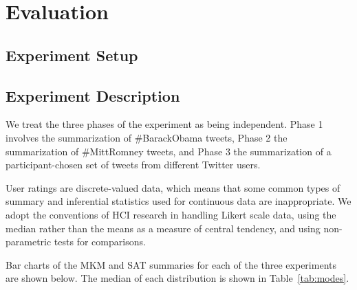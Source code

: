 \chapter{Evaluation}
\label{chap-five}
\newcommand{\ctheaders}[8]%
{\begin{tabular}{r|ccc||ccc|}
 \multicolumn{1}{r}{} & \multicolumn{3}{c}{#1}
      & \multicolumn{3}{c}{#2} \\ \cline{2-7}
 #3 %
      & \hspace{\cta} & #5 & \hspace{\cta}
      & \hspace{\cta} & #7 & \hspace{\cta}\ctstrut \\ \cline{2-7}
 #4 %
      & \hspace{\cta} & #6 & \hspace{\cta}
      & \hspace{\cta} & #8 & \hspace{\cta}\ctstrut \\ \cline{2-7}
\end{tabular}}

\section{Experiment Setup}

\section{Experiment Description}
We treat the three phases of the experiment as being independent.
Phase 1 involves the summarization of \#BarackObama tweets, Phase 2
the summarization of \#MittRomney tweets, and Phase 3 the
summarization of a participant-chosen set of tweets from different
Twitter users.

User ratings are discrete-valued data, which means that some common
types of summary and inferential statistics used for continuous data
are inappropriate.  We adopt the conventions of HCI research in
handling Likert scale data, using the median rather than the means as
a measure of central tendency, and using non-parametric tests for
comparisons.

Bar charts of the MKM and SAT summaries for each of the three
experiments are shown below.  The median of each distribution is shown
in Table~\ref{tab:modes}.


